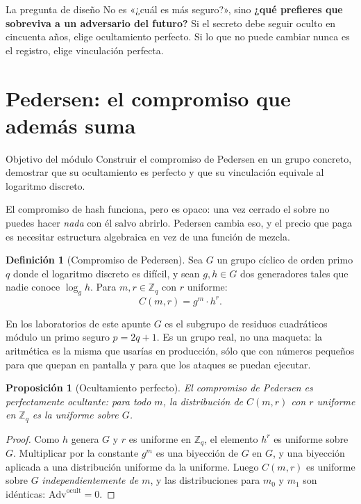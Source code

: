 \documentclass[11pt,a4paper]{article}
\theoremstyle{definition}
\newtheorem{definicion}{Definición}
\theoremstyle{plain}
\newtheorem{proposicion}{Proposición}
\theoremstyle{remark}
\newcommand{\Adv}{\mathrm{Adv}}
\newcommand{\Zq}{\mathbb{Z}_q}
\begin{document}
\begin{nota}{La pregunta de diseño}
No es «¿cuál es más seguro?», sino \textbf{¿qué prefieres que sobreviva a un
adversario del futuro?} Si el secreto debe seguir oculto en cincuenta años, elige
ocultamiento perfecto. Si lo que no puede cambiar nunca es el registro, elige
vinculación perfecta.
\end{nota}

\section{Pedersen: el compromiso que además suma}

\begin{nota}{Objetivo del módulo}
Construir el compromiso de Pedersen en un grupo concreto, demostrar que su
ocultamiento es perfecto y que su vinculación equivale al logaritmo discreto.
\end{nota}

El compromiso de hash funciona, pero es opaco: una vez cerrado el sobre no puedes
hacer \emph{nada} con él salvo abrirlo. Pedersen cambia eso, y el precio que paga
es necesitar estructura algebraica en vez de una función de mezcla.

\begin{definicion}[Compromiso de Pedersen]
Sea $G$ un grupo cíclico de orden primo $q$ donde el logaritmo discreto es
difícil, y sean $g, h \in G$ dos generadores tales que nadie conoce
$\log_g h$. Para $m, r \in \Zq$ con $r$ uniforme:
\[
  C(m, r) = g^{m} \cdot h^{r}.
\]
\end{definicion}

En los laboratorios de este apunte $G$ es el subgrupo de residuos cuadráticos
módulo un primo seguro $p = 2q+1$. Es un grupo real, no una maqueta: la
aritmética es la misma que usarías en producción, sólo que con números pequeños
para que quepan en pantalla y para que los ataques se puedan ejecutar.

\begin{proposicion}[Ocultamiento perfecto]\label{prop:pedhide}
El compromiso de Pedersen es perfectamente ocultante: para todo $m$, la
distribución de $C(m,r)$ con $r$ uniforme en $\Zq$ es la uniforme sobre $G$.
\end{proposicion}

\begin{proof}
Como $h$ genera $G$ y $r$ es uniforme en $\Zq$, el elemento $h^{r}$ es uniforme
sobre $G$. Multiplicar por la constante $g^{m}$ es una biyección de $G$ en $G$,
y una biyección aplicada a una distribución uniforme da la uniforme. Luego
$C(m,r)$ es uniforme sobre $G$ \emph{independientemente de $m$}, y las
distribuciones para $m_0$ y $m_1$ son idénticas: $\Adv^{\text{ocult}} = 0$.
\end{proof}
\end{document}
